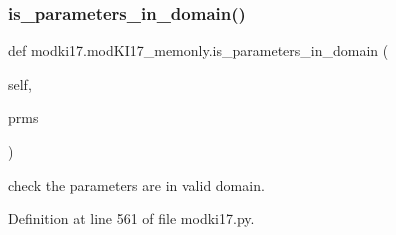 \subsubsection{\texorpdfstring{is\+\_\+parameters\+\_\+in\+\_\+domain()}{is\_parameters\_in\_domain()}}
{\footnotesize\ttfamily def modki17.\+mod\+K\+I17\+\_\+memonly.\+is\+\_\+parameters\+\_\+in\+\_\+domain (\begin{DoxyParamCaption}\item[{}]{self,  }\item[{}]{prms }\end{DoxyParamCaption})}

\begin{DoxyVerb}check the parameters are in valid domain.
\end{DoxyVerb}
 

Definition at line 561 of file modki17.\+py.


